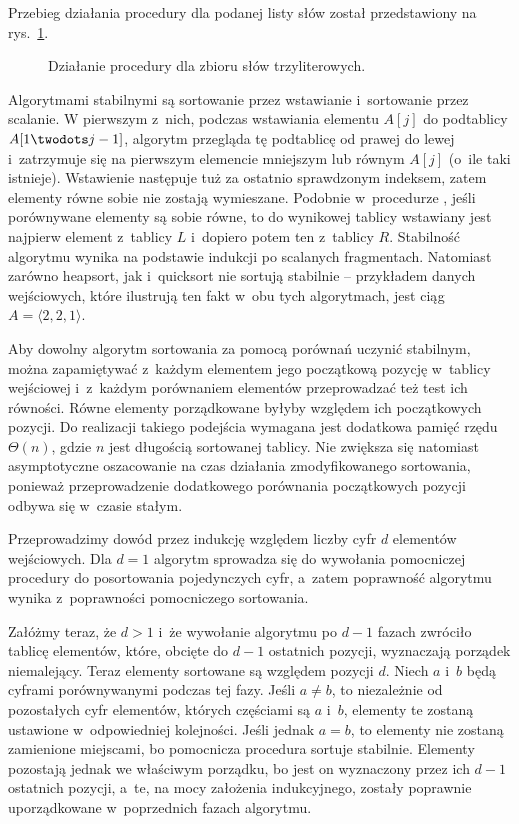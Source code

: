 
\exercise %
Przebieg działania procedury  dla podanej listy słów został przedstawiony na rys.\ \ref{fig:8.3-1}.
\begin{figure}[!ht]
	\centering 
	\caption{Działanie procedury  dla zbioru słów trzyliterowych.} \label{fig:8.3-1}
\end{figure}

\exercise %
Algorytmami stabilnymi są sortowanie przez wstawianie i~sortowanie przez scalanie.
W pierwszym z~nich, podczas wstawiania elementu $A[j]$ do podtablicy $A[1\twodots j-1]$, algorytm przegląda tę podtablicę od prawej do lewej i~zatrzymuje się na pierwszym elemencie mniejszym lub równym $A[j]$ (o~ile taki istnieje).
Wstawienie następuje tuż za ostatnio sprawdzonym indeksem, zatem elementy równe sobie nie zostają wymieszane.
Podobnie w~procedurze , jeśli porównywane elementy są sobie równe, to do wynikowej tablicy wstawiany jest najpierw element z~tablicy $L$ i~dopiero potem ten z~tablicy $R$.
Stabilność algorytmu wynika na podstawie indukcji po scalanych fragmentach.
Natomiast zarówno heapsort, jak i~quicksort nie sortują stabilnie -- przykładem danych wejściowych, które ilustrują ten fakt w~obu tych algorytmach, jest ciąg $A=\langle2,2,1\rangle$.

Aby dowolny algorytm sortowania za pomocą porównań uczynić stabilnym, można zapamiętywać z~każdym elementem jego początkową pozycję w~tablicy wejściowej i~z~każdym porównaniem elementów przeprowadzać też test ich równości.
Równe elementy porządkowane byłyby względem ich początkowych pozycji.
Do realizacji takiego podejścia wymagana jest dodatkowa pamięć rzędu $\Theta(n)$, gdzie $n$ jest długością sortowanej tablicy.
Nie zwiększa się natomiast asymptotyczne oszacowanie na czas działania zmodyfikowanego sortowania, ponieważ przeprowadzenie dodatkowego porównania początkowych pozycji odbywa się w~czasie stałym.

\exercise %
Przeprowadzimy dowód przez indukcję względem liczby cyfr $d$ elementów wejściowych.
Dla $d=1$ algorytm  sprowadza się do wywołania pomocniczej procedury do posortowania pojedynczych cyfr, a~zatem poprawność algorytmu wynika z~poprawności pomocniczego sortowania.

Załóżmy teraz, że $d>1$ i~że wywołanie algorytmu  po $d-1$ fazach zwróciło tablicę elementów, które, obcięte do $d-1$ ostatnich pozycji, wyznaczają porządek niemalejący.
Teraz elementy sortowane są względem pozycji $d$.
Niech $a$ i~$b$ będą cyframi porównywanymi podczas tej fazy.
Jeśli $a\ne b$, to niezależnie od pozostałych cyfr elementów, których częściami są $a$ i~$b$, elementy te zostaną ustawione w~odpowiedniej kolejności.
Jeśli jednak $a=b$, to elementy nie zostaną zamienione miejscami, bo pomocnicza procedura sortuje stabilnie.
Elementy pozostają jednak we właściwym porządku, bo jest on wyznaczony przez ich $d-1$ ostatnich pozycji, a~te, na mocy założenia indukcyjnego, zostały poprawnie uporządkowane w~poprzednich fazach algorytmu.

